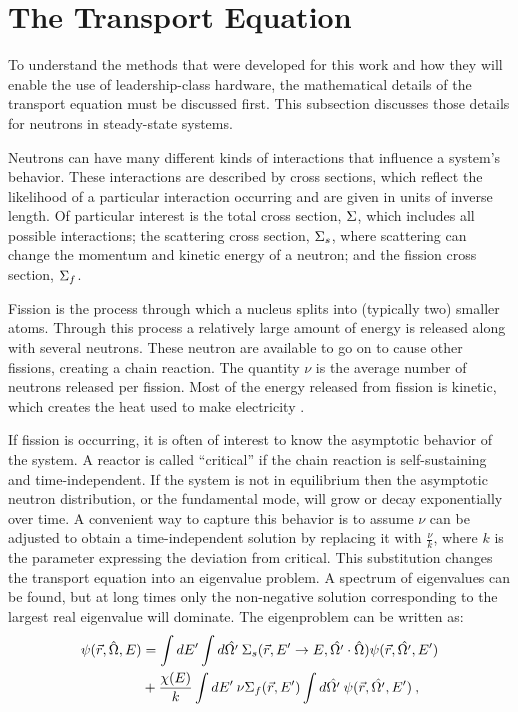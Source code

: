 \section{The Transport Equation}
To understand the methods that were developed for this work and how they will enable the use of leadership-class hardware, the mathematical details of the transport equation must be discussed first. This subsection discusses those details for neutrons in steady-state systems. 

Neutrons can have many different kinds of interactions that influence a system's behavior. These interactions are described by cross sections, which reflect the likelihood of a particular interaction occurring and are given in units of inverse length. Of particular interest is the total cross section, $\Sigma$, which includes all possible interactions; the scattering cross section, $\Sigma_{s}$, where scattering can change the momentum and kinetic energy of a neutron; and the fission cross section, $\Sigma_{f}$.   

Fission is the process through which a nucleus splits into (typically two) smaller atoms. Through this process a relatively large amount of energy is released along with several neutrons. These neutron are available to go on to cause other fissions, creating a chain reaction. The quantity $\nu$ is the average number of neutrons released per fission. Most of the energy released from fission is kinetic, which creates the heat used to make electricity \cite{Lewis1993}.  

If fission is occurring, it is often of interest to know the asymptotic behavior of the system. A reactor is called ``critical'' if the chain reaction is self-sustaining and time-independent. If the system is not in equilibrium then the asymptotic neutron distribution, or the fundamental mode, will grow or decay exponentially over time. A convenient way to capture this behavior is to assume $\nu$ can be adjusted to obtain a time-independent solution by replacing it with $\frac{\nu}{k}$, where $k$ is the parameter expressing the deviation from critical. This substitution changes the transport equation into an eigenvalue problem. A spectrum of eigenvalues can be found, but at long times only the non-negative solution corresponding to the largest real eigenvalue will dominate. The eigenproblem can be written as:
%
\begin{align}
   [\hat{\Omega} \cdot \nabla + \Macro(\vec{r}, E)] \psi(\vec{r}, \hat{\Omega}, E)  &=  \int dE' \int d\hat{\Omega'} \:\Macro_{s}(\vec{r}, E' \to E, \hat{\Omega'} \cdot \hat{\Omega}) \psi(\vec{r}, \hat{\Omega'}, E') \nonumber \\
&+\frac{ \chi(E)}{k} \int dE' \:\nu \Macro_{f}(\vec{r}, E') \int d\hat{\Omega'} \:\psi(\vec{r}, \hat{\Omega'}, E') \:,
\label{eq:neutron transport}
\end{align}

